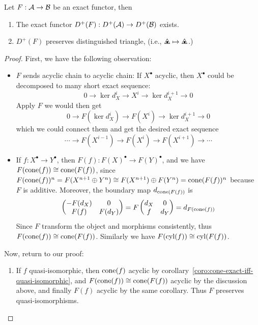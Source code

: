 \begin{prop}
  Let $F: \mathcal{A} \to \mathcal{B}$ be an exact functor, then
  \begin{enumerate}
    \item The exact functor $D^+(F): D^+(\mathcal{A}) \to D^+(\mathcal{B})$ exists.
    \item $D^+(F)$ preserves distinguished triangle, (i.e., $\tridot \mapsto \tridot$.)
  \end{enumerate}
  \begin{proof}
    First, we have the following observation:
    \begin{itemize}
      \item $F$ sends acyclic chain to acyclic chain:
        If $X^\bullet$ acyclic, then $X^\bullet$ could be decomposed to
        many short exact sequence:
        \[ 0 \to \ker d_X^i \to X^i \to \ker d_X^{i+1} \to 0 \]
        Apply $F$ we would then get
        \[ 0 \to F(\ker d_X^i) \to F(X^i) \to \ker d_X^{i+1} \to 0 \]
        which we could connect them and get the desired exact sequence
        \[ \cdots \to F(X^{i-1}) \to F(X^i) \to F(X^{i+1}) \to \cdots \]
      \item If $f : X^\bullet \to Y^\bullet$, then $F(f): F(X)^\bullet \to F(Y)^\bullet$,
        and we have $F(\operatorname{cone}(f)) \cong \operatorname{cone}(F(f))$,
        since $F(\operatorname{cone}(f))^n = F(X^{n+1} \oplus Y^n) \cong F(X^{n+1}) \oplus F(Y^n)
        = \operatorname{cone}(F(f))^n$ because $F$ is additive.
        Moreover, the boundary map $d_{\operatorname{cone}(F(f))}$ is
        \[ \begin{pmatrix}
            -F(d_X) & 0 \\ F(f) & F(d_Y)
        \end{pmatrix} = F \begin{pmatrix}
            d_X & 0 \\ f & d_Y
          \end{pmatrix} = d_{F(\operatorname{cone}(f))}
        \]
        Since $F$ transform the object and morphisms consistently, thus
        $F(\operatorname{cone}(f)) \cong \operatorname{cone}(F(f))$. Similarly we have
        $F(\operatorname{cyl}(f)) \cong \operatorname{cyl}(F(f))$.
    \end{itemize}
    Now, return to our proof:
    \begin{enumerate}
      \item If $f$ quasi-isomorphic, then $\operatorname{cone}(f)$ acyclic by
        corollary~\ref{coro:cone-exact-iff-quasi-isomorphic},
        and $F(\operatorname{cone}(f)) \cong \operatorname{cone}(F(f))$ acyclic by the discussion
        above, and finally $F(f)$ acyclic by the same corollary.
        Thus $F$ preserves quasi-isomorphisms.


\end{enumerate}
\end{proof}
\end{prop}
